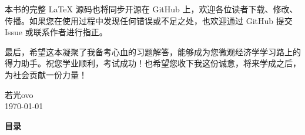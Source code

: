 \documentclass[a4paper, 10pt, openany]{ctexbook}
\begin{document}
	本书的完整 LaTeX 源码也将同步开源在 GitHub 上，欢迎各位读者下载、修改、传播。如果您在使用过程中发现任何错误或不足之处，也欢迎通过 GitHub 提交 Issue 或联系作者进行指正。
	
	最后，希望这本凝聚了我备考心血的习题解答，能够成为您微观经济学学习路上的得力助手。祝您学业顺利，考试成功！也希望您收下我这份诚意，将来学成之后，为社会贡献一份力量！
	
	
	\begin{flushright}
		若光ovo \\
		\today
	\end{flushright}
	
	\clearpage 
	
	\begin{tcolorbox}[
		enhanced, breakable, 
		width=0.9\textwidth, center, 
		colback=white, colframe=white, 
		top=1.5cm, bottom=1.5cm, left=1cm, right=1cm
		]
		\begin{center}
			\LARGE\bfseries\color{black} 目\quad 录 
		\end{center}
		\vspace{1em}
		\makeatletter
		\makeatother
	\end{tcolorbox}
	\clearpage 
	
	\mainmatter
	
	
\end{document}
